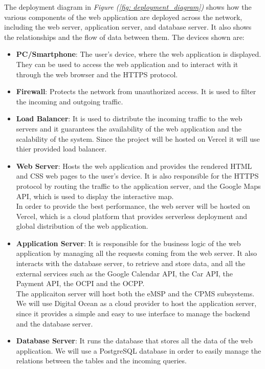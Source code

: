 \documentclass[table, 12pt]{article}
\begin{document}
The deployment diagram in \textit{Figure (\ref{fig: deployment_diagram})} shows how the various components of the web application are deployed across the network, including the web server, application server, and database server. It also shows the relationships and the flow of data between them.
The devices shown are:
\begin{itemize}
    \item \textbf{PC/Smartphone}: The user's device, where the web application is displayed. They can be used to access the web application and to interact with it through the web browser and the HTTPS protocol.
    \item \textbf{Firewall}: Protects the network from unauthorized access. It is used to filter the incoming and outgoing traffic.
    \item \textbf{Load Balancer}: It is used to distribute the incoming traffic to the web servers and it guarantees the availability of the web application and the scalability of the system. Since the project will be hosted on Vercel it will use thier provided load balancer.
    \item \textbf{Web Server}: Hosts the web application and provides the rendered HTML and CSS web pages to the user's device. It is also responsible for the HTTPS protocol by routing the traffic to the application server, and the Google Maps API, which is used to display the interactive map.\\In order to provide the best performance, the web server will be hosted on Vercel, which is a cloud platform that provides serverless deployment and global distribution of the web application.
    \item \textbf{Application Server}: It is responsible for the business logic of the web application by managing all the requests coming from the web server. It also interacts with the database server, to retrieve and store data, and all the external services such as the Google Calendar API, the Car API, the Payment API, the OCPI and the OCPP.\\ The applicaiton server will host both the eMSP and the CPMS subsystems. We will use Digital Ocean as a cloud provider to host the application server, since it provides a simple and easy to use interface to manage the backend and the database server.
    \item \textbf{Database Server}: It runs the database that stores all the data of the web application. We will use a PostgreSQL database in order to easily manage the relations between the tables and the incoming queries.
\end{itemize}
\newpage
\end{document}
